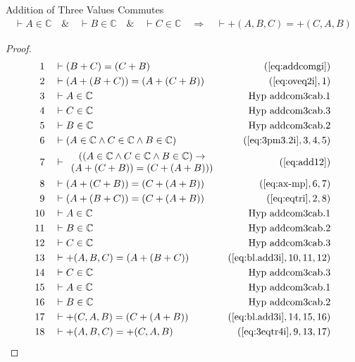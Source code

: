 \begin{lemma} {Addition of Three Values Commutes}
\begin{align}
\vdash A \in \mathbb{C}\quad\&\quad \vdash B \in \mathbb{C}\quad\&\quad \vdash
    C \in \mathbb{C}\quad\Rightarrow\quad \vdash +( A , B , C ) = +( C , A , B
    )\label{eq:bl.addcom3cab}\tag{bl.addcom3cab}
\end{align}
\end{lemma}


\begin{proof}
\begin{align}
  1 &&  & \vdash ( B + C ) = ( C + B )&(\mbox{\ref{eq:addcomgi}})\notag
  \\ 2 &&  & \vdash ( A + ( B + C ) ) = ( A + ( C + B )
     )&(\mbox{\ref{eq:oveq2i}},1)\notag
  \\ 3 &&  & \vdash A \in
\mathbb{C}&\text{Hyp~addcom3cab.1}\notag%
  \\ 4 &&  & \vdash C \in
\mathbb{C}&\text{Hyp~addcom3cab.3}\notag%
  \\ 5 &&  & \vdash B \in
\mathbb{C}&\text{Hyp~addcom3cab.2}\notag%
  \\ 6 &&  & \vdash ( A \in \mathbb{C} \wedge C \in \mathbb{C} \wedge B \in
     \mathbb{C} )&(\mbox{\ref{eq:3pm3.2i}},3,4,5)\notag
  \\ 7 &&  & \vdash 
     \begin{array}{c}
     ( ( A \in \mathbb{C} \wedge C \in \mathbb{C} \wedge B \in
     \mathbb{C} ) \rightarrow \\
      ( A + ( C + B ) ) = ( C + ( A + B ) ) )
     \end{array}
     &(\mbox{\ref{eq:add12}})\notag
  \\ 8 &&  & \vdash ( A + ( C + B ) ) = ( C + ( A + B )
     )&(\mbox{\ref{eq:ax-mp}},6,7)\notag
  \\ 9 &&  & \vdash ( A + ( B + C ) ) = ( C + ( A + B )
     )&(\mbox{\ref{eq:eqtri}},2,8)\notag
  \\ 10 &&  & \vdash A \in
\mathbb{C}&\text{Hyp~addcom3cab.1}\notag%
  \\ 11 &&  & \vdash B \in
\mathbb{C}&\text{Hyp~addcom3cab.2}\notag%
  \\ 12 &&  & \vdash C \in
\mathbb{C}&\text{Hyp~addcom3cab.3}\notag%
  \\ 13 &&  & \vdash +( A , B , C ) = ( A + ( B + C )
     )&(\mbox{\ref{eq:bl.add3i}},10,11,12)\notag
  \\ 14 &&  & \vdash C \in
\mathbb{C}&\text{Hyp~addcom3cab.3}\notag%
  \\ 15 &&  & \vdash A \in
\mathbb{C}&\text{Hyp~addcom3cab.1}\notag%
  \\ 16 &&  & \vdash B \in
\mathbb{C}&\text{Hyp~addcom3cab.2}\notag%
  \\ 17 &&  & \vdash +( C , A , B ) = ( C + ( A + B )
     )&(\mbox{\ref{eq:bl.add3i}},14,15,16)\notag
  \\ 18 &&  & \vdash +( A , B , C ) = +( C , A , B
     )&(\mbox{\ref{eq:3eqtr4i}},9,13,17)\notag
\end{align}
\end{proof}

